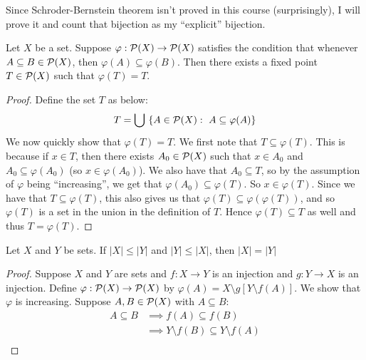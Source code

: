 \documentclass{article}
\begin{document}
 {
    Since Schroder-Bernstein theorem isn't proved in this course (surprisingly), I will prove it and count that bijection as my ``explicit'' bijection. 

    \begin{lemma*}
        Let $X$ be a set. Suppose $\varphi: \mathcal{P}(X)\to\mathcal{P}(X)$ satisfies the condition that whenever $A\subseteq B\in \mathcal{P}(X)$, then $\varphi(A)\subseteq \varphi(B)$. Then there exists a fixed point $T\in\mathcal{P}(X)$ such that $\varphi(T) = T$.
    \end{lemma*}
    \begin{proof}
        Define the set $T$ as below:
        \begin{align*}
            T = \bigcup\ \{A\in\mathcal{P}(X):\ A\subseteq \varphi(A)\}
        \end{align*}
        We now quickly show that $\varphi(T) = T$. We first note that $T\subseteq \varphi(T)$. This is because if $x\in T$, then there exists $A_{0}\in \mathcal{P}(X)$ such that  $x\in A_{0}$ and $A_{0}\subseteq \varphi(A_{0})$ (so $x\in \varphi(A_{0})$). We also have that $A_{0}\subseteq T$, so by the assumption of $\varphi$ being ``increasing'', we get that $\varphi(A_{0})\subseteq \varphi(T)$. So $x\in \varphi(T)$. Since we have that $T\subseteq \varphi(T)$, this also gives us that $\varphi(T)\subseteq \varphi(\varphi(T))$, and so $\varphi(T)$ is a set in the union in the definition of $T$. Hence $\varphi(T)\subseteq T$ as well and thus $T = \varphi(T)$.
    \end{proof}
    \begin{thm*}
        Let $X$ and $Y$ be sets. If $\lvert X\rvert \leq \lvert Y\rvert$ and $\lvert Y\rvert \leq \lvert X\rvert$, then $\lvert X\rvert = \lvert Y\rvert $
    \end{thm*}
    \begin{proof}
        Suppose $X$ and $Y$ are sets and $f: X\to Y$ is an injection and $g:Y\to X$ is an injection. Define $\varphi: \mathcal{P}(X)\to \mathcal{P}(X)$ by $\varphi(A) = X\setminus g[Y\setminus f(A)]$. We show that $\varphi$ is increasing. Suppose $A,B\in\mathcal{P}(X)$ with $A\subseteq B$:
        \begin{align*}
            A\subseteq B &\implies f(A)\subseteq f(B)\\
            &\implies Y\setminus f(B)\subseteq Y\setminus f(A)\\

\end{align*}
\end{proof}}
\end{document}
